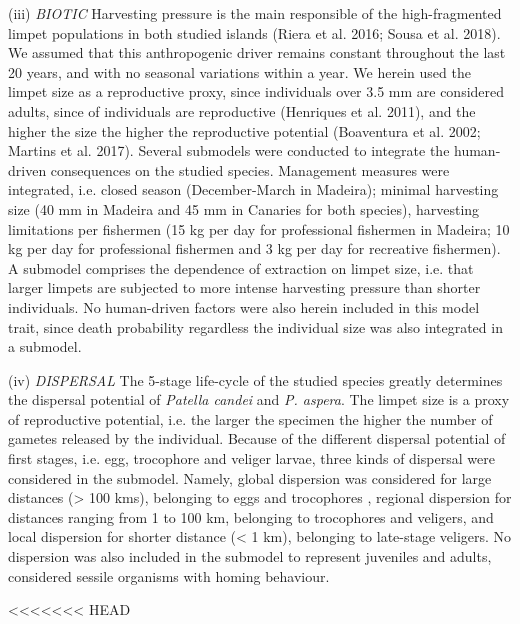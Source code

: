 \documentclass[12pt]{article}
\begin{document}
\begin{flushleft}
(iii) \textit{BIOTIC}
Harvesting pressure is the main responsible of the high-fragmented limpet populations in both studied islands (Riera et al. 2016; Sousa et al. 2018). We assumed that this anthropogenic driver remains constant throughout the last 20 years, and with no seasonal variations within a year. We herein used the limpet size as a reproductive proxy, since individuals over 3.5 mm are considered adults, since  of individuals are reproductive (Henriques et al. 2011), and the higher the size the higher the reproductive potential (Boaventura et al. 2002; Martins et al. 2017). Several submodels were conducted to integrate the human-driven consequences on the studied species. Management measures were integrated, i.e. closed season (December-March in Madeira); minimal harvesting size (40 mm in Madeira and 45 mm in Canaries for both species), harvesting limitations per fishermen (15 kg per day for professional fishermen in Madeira; 10 kg per day for professional fishermen and 3 kg per day for recreative fishermen). A submodel comprises the dependence of extraction on limpet size, i.e. that larger limpets are subjected to more intense harvesting pressure than shorter individuals.
No human-driven factors were also herein included in this model trait, since death probability regardless the individual size was also integrated in a submodel.

(iv) \textit{DISPERSAL}
The 5-stage life-cycle of the studied species greatly determines the dispersal potential of \textit{Patella candei} and \textit{P. aspera}. The limpet size is a proxy of reproductive potential, i.e. the larger the specimen the higher the number of gametes released by the individual. Because of the different dispersal potential of first stages, i.e. egg, trocophore and veliger larvae, three kinds of dispersal were considered in the submodel. Namely, global dispersion was considered for large distances (> 100 kms), belonging to eggs and trocophores , regional dispersion for distances ranging from 1 to 100 km, belonging to trocophores and veligers, and local dispersion for shorter distance (< 1 km), belonging to late-stage veligers. No dispersion was also included in the submodel to represent juveniles and adults, considered sessile organisms with homing behaviour.

<<<<<<< HEAD

\end{flushleft}
\end{document}
